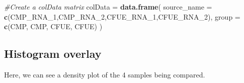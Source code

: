 \documentclass[
]{article}
\newenvironment{Shaded}{\begin{snugshade}}{\end{snugshade}}
\newcommand{\AttributeTok}[1]{\textcolor[rgb]{0.13,0.29,0.53}{#1}}
\newcommand{\CommentTok}[1]{\textcolor[rgb]{0.56,0.35,0.01}{\textit{#1}}}
\newcommand{\FunctionTok}[1]{\textcolor[rgb]{0.13,0.29,0.53}{\textbf{#1}}}
\newcommand{\NormalTok}[1]{#1}
\newcommand{\OtherTok}[1]{\textcolor[rgb]{0.56,0.35,0.01}{#1}}
\newcommand{\StringTok}[1]{\textcolor[rgb]{0.31,0.60,0.02}{#1}}
\begin{document}
\begin{Shaded}
\begin{Highlighting}[]
\CommentTok{\#Create a colData matrix}
\NormalTok{colData }\OtherTok{=} \FunctionTok{data.frame}\NormalTok{(}
  \AttributeTok{source\_name =} \FunctionTok{c}\NormalTok{(}\StringTok{\textquotesingle{}CMP\_RNA\_1\textquotesingle{}}\NormalTok{,}\StringTok{\textquotesingle{}CMP\_RNA\_2\textquotesingle{}}\NormalTok{,}\StringTok{\textquotesingle{}CFUE\_RNA\_1\textquotesingle{}}\NormalTok{,}\StringTok{\textquotesingle{}CFUE\_RNA\_2\textquotesingle{}}\NormalTok{),}
  \AttributeTok{group =} \FunctionTok{c}\NormalTok{(}\StringTok{\textquotesingle{}CMP\textquotesingle{}}\NormalTok{, }\StringTok{\textquotesingle{}CMP\textquotesingle{}}\NormalTok{, }\StringTok{\textquotesingle{}CFUE\textquotesingle{}}\NormalTok{, }\StringTok{\textquotesingle{}CFUE\textquotesingle{}}\NormalTok{)}
\NormalTok{  )}
\end{Highlighting}
\end{Shaded}

\hypertarget{histogram-overlay}{%
\subsection{Histogram overlay}\label{histogram-overlay}}

Here, we can see a density plot of the 4 samples being compared.
\end{document}
